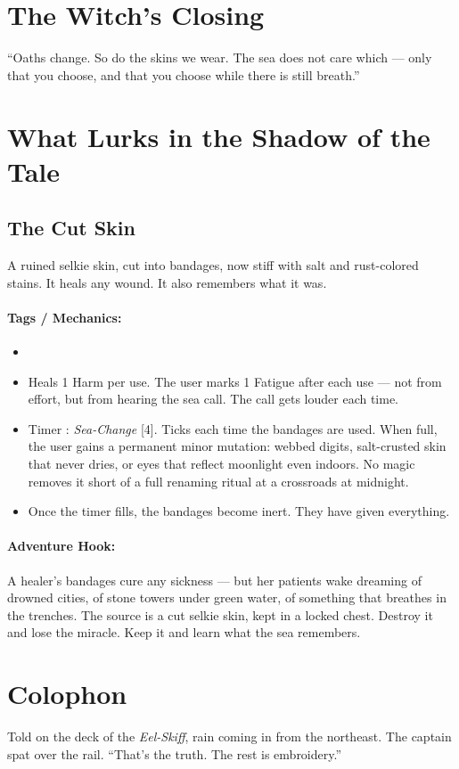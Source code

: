 \section*{The Witch's Closing}
``Oaths change. So do the skins we wear. The sea does not care which --- only that you choose, and that you choose while there is still breath.''

\section*{What Lurks in the Shadow of the Tale}

\subsection*{The Cut Skin}

A ruined selkie skin, cut into bandages, now stiff with salt and rust-colored stains. It heals any wound. It also remembers what it was.

\paragraph{Tags / Mechanics:}
\begin{itemize}
\item [HEAL] [CURSE] [TRANSFORM]
\item Heals 1 Harm per use. The user marks 1 Fatigue after each use --- not from effort, but from hearing the sea call. The call gets louder each time.
\item Timer : \textit{Sea-Change} [4]. Ticks each time the bandages are used. When full, the user gains a permanent minor mutation: webbed digits, salt-crusted skin that never dries, or eyes that reflect moonlight even indoors. No magic removes it short of a full renaming ritual at a crossroads at midnight.
\item Once the timer fills, the bandages become inert. They have given everything.
\end{itemize}

\paragraph{Adventure Hook:}
A healer's bandages cure any sickness --- but her patients wake dreaming of drowned cities, of stone towers under green water, of something that breathes in the trenches. The source is a cut selkie skin, kept in a locked chest. Destroy it and lose the miracle. Keep it and learn what the sea remembers.

\section*{Colophon}
Told on the deck of the \textit{Eel-Skiff}, rain coming in from the northeast. The captain spat over the rail. ``That's the truth. The rest is embroidery.''